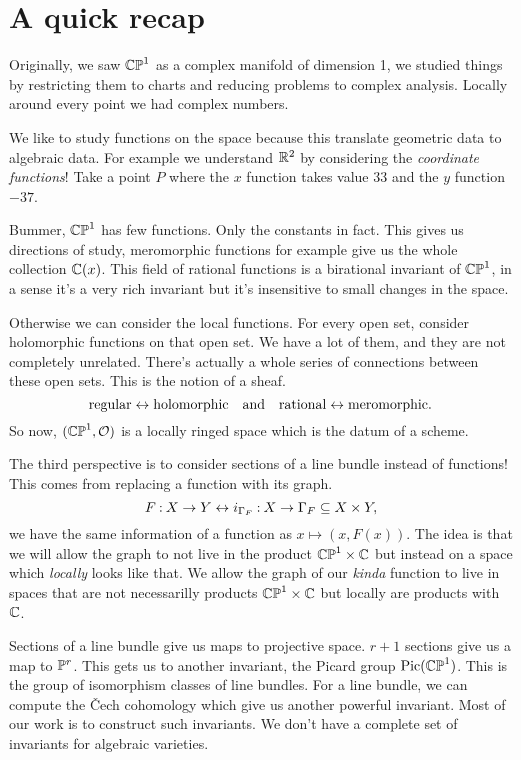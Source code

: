 \documentclass[12pt]{memoir}
\begin{document}
\section{A quick recap}

Originally, we saw $\mathbb{CP}^1$ as a complex manifold of dimension 1, we studied things by restricting them to charts and reducing problems to complex analysis. Locally around every point we had complex numbers.\par
We like to study functions on the space because this translate geometric data to algebraic data. For example we understand $\mathbb{R}^2$ by considering the \emph{coordinate functions}! Take a point $P$ where the $x$ function takes value $33$ and the $y$ function $-37$.\par
Bummer, $\mathbb{CP}^1$ has few functions. Only the constants in fact. This gives us directions of study, meromorphic functions for example give us the whole collection $\mathbb{C}(x)$. This field of rational functions is a birational invariant of $\mathbb{CP}^1$, in a sense it's a very rich invariant but it's insensitive to small changes in the space.\par
Otherwise we can consider the local functions. For every open set, consider holomorphic functions on that open set. We have a lot of them, and they are not completely unrelated. There's actually a whole series of connections between these open sets. This is the notion of a sheaf. 
$$\text{regular}\leftrightarrow\text{holomorphic}\quad\text{and}\quad\text{rational}\leftrightarrow\text{meromorphic}.$$
So now, $(\mathbb{CP}^1,\mathcal{O})$ is a locally ringed space which is the datum of a scheme.\par
The third perspective is to consider sections of a line bundle instead of functions! This comes from replacing a function with its graph.
$$F\mathbin{:}X\to Y\leftrightarrow i_{\Gamma_F}\mathbin{:} X\to\Gamma_F\subseteq X\times Y,$$
we have the same information of a function as $x\mapsto(x,F(x))$. The idea is that we will allow the graph to not live in the product $\mathbb{CP}^1\times\mathbb{C}$ but instead on a space which \emph{locally} looks like that. We allow the graph of our \emph{kinda} function to live in spaces that are not necessarilly products $\mathbb{CP}^1\times\mathbb{C}$ but locally are products with $\mathbb{C}$.\par
Sections of a line bundle give us maps to projective space. $r+1$ sections give us a map to $\mathbb{P}^r$. This gets us to another invariant, the Picard group $\operatorname{Pic}(\mathbb{CP}^1)$. This is the group of isomorphism classes of line bundles. For a line bundle, we can compute the \v{C}ech cohomology which give us another powerful invariant. Most of our work is to construct such invariants. We don't have a complete set of invariants for algebraic varieties.
\end{document}
